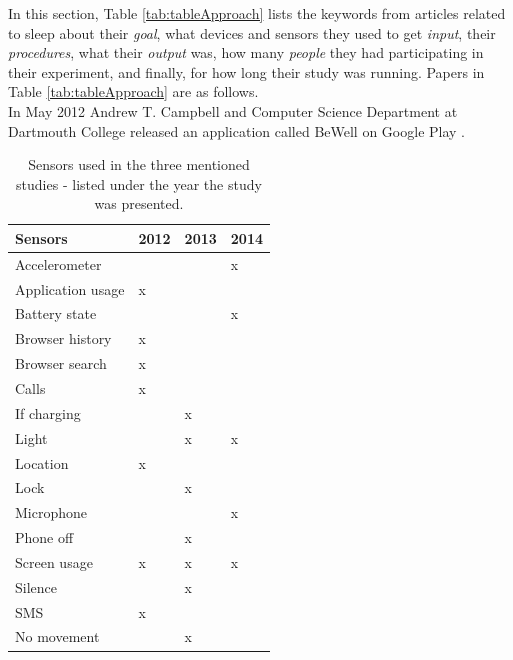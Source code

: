 \documentclass[12pt]{article} %
\begin{document}
In this section, Table \ref{tab:tableApproach} lists the keywords from articles related to sleep about their \textit{goal}, what devices and sensors they used to get \textit{input}, their \textit{procedures}, what their \textit{output} was, how many \textit{people} they had participating in their experiment, and finally, for how long their study was running. Papers in Table \ref{tab:tableApproach} are as follows. \\

In May 2012 Andrew T. Campbell and Computer Science Department at Dartmouth College released an application called BeWell on Google Play \cite{bewellDartmouth}. 

\begin{table}
\center
\begin{footnotesize}
	\begin{tabular}{|p{2.8cm} |p{1.2cm} |p{1.2cm} |p{1.2cm} |}
	\hline
	\textbf{Sensors} & \textbf{{\tiny 2012 \cite{beWell}}} & \textbf{{\tiny 2013 \cite{compare}}} & \textbf{{\tiny 2014 \cite{toss}}} \\
	\hline
Accelerometer & & & x\\
Application usage & x & & 	\\
Battery state & & & x\\
Browser history & x & & \\
Browser search & x & & \\	
Calls & x & & \\
If charging & & x &\\
Light & & x & x\\
Location & x & & \\
Lock & & x &\\
Microphone & & & x\\
Phone off & & x & \\
Screen usage & x & x & x\\
Silence & & x &\\  
SMS & x & & 	\\
No movement & & x & \\
	\hline
	\end{tabular}
	\caption{Sensors used in the three mentioned studies - listed under the year the study was presented.}
	\label{tab:sensors}
\end{footnotesize}
\end{table}
\end{document}

